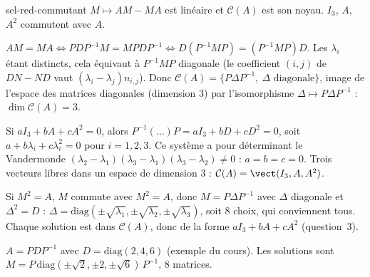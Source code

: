 \begin{corrige}{sel-red-commutant}
 $M\mapsto AM-MA$ est linéaire et $\mathcal C(A)$ est son noyau. $I_3$, $A$, $A^2$ commutent avec $A$.

 $AM=MA\iff PDP^{-1}M=MPDP^{-1}\iff D(P^{-1}MP)=(P^{-1}MP)D$. Les $\lambda_i$ étant distincts, cela équivaut à $P^{-1}MP$
diagonale (le coefficient $(i,j)$ de $DN-ND$ vaut $(\lambda_i-\lambda_j)n_{i,j}$). Donc $\mathcal C(A)=\{P\Delta P^{-1},\ \Delta\text{ diagonale}\}$,
image de l'espace des matrices diagonales (dimension $3$) par l'isomorphisme $\Delta\mapsto P\Delta P^{-1}$ : $\dim\mathcal C(A)=3$.

 Si $aI_3+bA+cA^2=0$, alors $P^{-1}(\dots)P=aI_3+bD+cD^2=0$, soit $a+b\lambda_i+c\lambda_i^2=0$ pour $i=1,2,3$. Ce système a pour
déterminant le Vandermonde $(\lambda_2-\lambda_1)(\lambda_3-\lambda_1)(\lambda_3-\lambda_2)\neq0$ : $a=b=c=0$. Trois vecteurs libres
dans un espace de dimension $3$ : $\mathcal C(A)=\vect(I_3,A,A^2)$.

 Si $M^2=A$, $M$ commute avec $M^2=A$, donc $M=P\Delta P^{-1}$ avec $\Delta$ diagonale et $\Delta^2=D$ :
$\Delta=\mathrm{diag}(\pm\sqrt{\lambda_1},\pm\sqrt{\lambda_2},\pm\sqrt{\lambda_3})$, soit $8$ choix, qui conviennent tous. Chaque solution est
dans $\mathcal C(A)$, donc de la forme $aI_3+bA+cA^2$ (question~3).

 $A=PDP^{-1}$ avec $D=\mathrm{diag}(2,4,6)$ (exemple du cours). Les solutions sont
$M=P\,\mathrm{diag}(\pm\sqrt2,\pm2,\pm\sqrt6)\,P^{-1}$, $8$ matrices.
\end{corrige}

